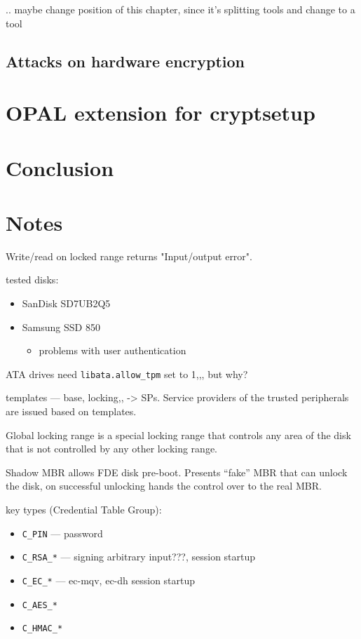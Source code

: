 \documentclass[
  digital, %
  oneside, %
  nolof,     %
  nolot,     %
]{fithesis4}
\begin{document}
.. maybe change position of this chapter, since it's splitting tools and change to a tool

\section{Attacks on hardware encryption}

\chapter{OPAL extension for cryptsetup}

\chapter{Conclusion}

\chapter{Notes}

Write/read on locked range returns "Input/output error".

tested disks:
\begin{itemize}
    \item SanDisk SD7UB2Q5
    \item Samsung SSD 850
    \begin{itemize}
        \item problems with user authentication
    \end{itemize}
\end{itemize}

ATA drives need \verb|libata.allow_tpm| set to 1,,, but why?

templates --- base, locking,, -> SPs. Service providers of the trusted peripherals are issued based on templates.

Global locking range is a special locking range that controls any area of the disk that is not controlled by any other locking range.

Shadow MBR allows FDE disk pre-boot. Presents ``fake'' MBR that can unlock the disk, on successful unlocking hands the control over to the real MBR.

key types (Credential Table Group): \begin{itemize}
    \item \verb|C_PIN| --- password
    \item \verb|C_RSA_*| --- signing arbitrary input???, session startup
    \item \verb|C_EC_*| --- ec-mqv, ec-dh session startup
    \item \verb|C_AES_*|
    \item \verb|C_HMAC_*|
\end{itemize}
\end{document}
